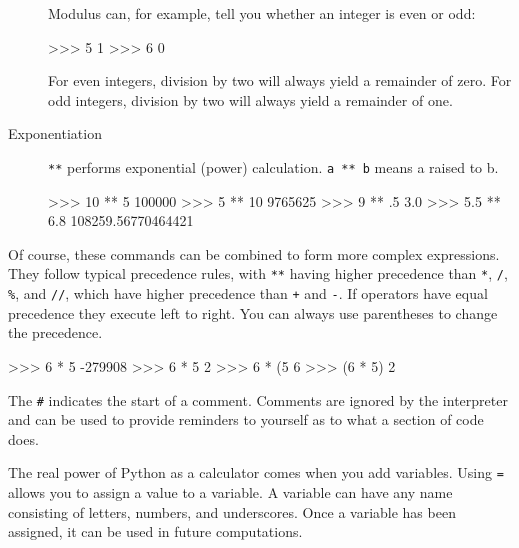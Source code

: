 \documentclass[11pt]{cselabheader}
\begin{document}
\begin{description}
    Modulus can, for example, tell you whether an integer is even or odd:

    \begin{python3code}
>>> 5 %
1
>>> 6 %
0
    \end{python3code}
    For even integers, division by two will always yield a remainder of zero.
    For odd integers, division by two will always yield a remainder of one.

  \item[Exponentiation] \texttt{**} performs exponential (power) calculation.
    \texttt{a ** b} means a raised to b.

    \begin{python3code}
>>> 10 ** 5
100000
>>> 5 ** 10 
9765625
>>> 9 ** .5
3.0
>>> 5.5 ** 6.8
108259.56770464421
    \end{python3code}

%
%
\end{description}

Of course, these commands can be combined to form more complex expressions. They
follow typical precedence rules, with \texttt{**} having higher precedence than
\texttt{*}, \texttt{/}, \texttt{\%}, and \texttt{//}, which have higher
precedence than \texttt{+} and \texttt{-}. If operators have equal precedence
they execute left to right. You can always use parentheses to change the
precedence.

\begin{python3code}
>>> 6 * 5 %
-279908
>>> 6 * 5 %
2
>>> 6 * (5 %
6
>>> (6 * 5) %
2
\end{python3code}

The \texttt{\#} indicates the start of a comment. Comments are ignored by the
interpreter and can be used to provide reminders to yourself as to what a
section of code does.

The real power of Python as a calculator comes when you add variables. Using
\texttt{=} allows you to assign a value to a variable. A variable can have any
name consisting of letters, numbers, and underscores. Once a variable has been
assigned, it can be used in future computations.
\end{document}
